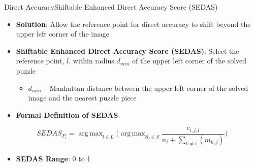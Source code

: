 \documentclass[handout,10pt]{beamer}  %
\DeclareMathOperator*{\argmax}{arg\,max} %
\begin{document}
\begin{frame}{Direct Accuracy}{Shiftable Enhanced Direct Accuracy Score (SEDAS)}
  \begin{itemize}
    \item \textbf{Solution}: Allow the reference point for direct accuracy to shift beyond the upper left corner of the image
    \vfill
    \item \textbf{Shiftable Enhanced Direct Accuracy Score (SEDAS)}: Select the reference point, $l$, within radius $d_{min}$ of the upper left corner of the solved puzzle
    \begin{itemize}
      \vspace{0.6em}
      \item $d_{min}$ -- Manhattan distance between the upper left corner of the solved image and the nearest puzzle piece
    \end{itemize}
    \vfill
    \item \textbf{Formal Definition of SEDAS}:
  \end{itemize}
  \vfill  
  \begin{equation} \label{eq:shiftableEnhancedDirectAccuracyScore}
    SEDAS_{P_i} = \argmax_{l \in L} \bigg( \argmax_{S_j \in S}\frac{c_{i,j,l}}{n_i + \sum_{k \ne i}(m_{k,j})} \bigg)
  \end{equation}
  \vspace{-1em}
  \vfill
  \begin{itemize}
    \item \textbf{SEDAS Range}: 0 to 1
  \end{itemize}
\end{frame}
\end{document}

